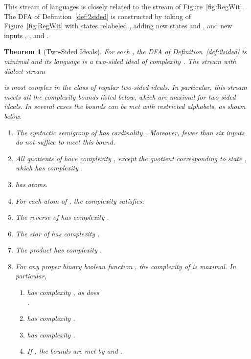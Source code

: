 \documentclass[final]{dmtcs-episciences}
\newcommand{\be}{\begin{enumerate}}
\newcommand{\ee}{\end{enumerate}}
\newtheorem{theorem}{Theorem}
\theoremstyle{definition}
\theoremstyle{remark}
\begin{document}
This stream of languages is closely related to the stream of Figure~\ref{fig:RegWit}.
The DFA  of Definition~\ref{def:2sided} is constructed by taking  of Figure~\ref{fig:RegWit} with states relabeled , adding new states  and , and new inputs ,  , and . 


\begin{theorem}[Two-Sided Ideals]
For each ,  
the DFA  of Definition~\ref{def:2sided} is minimal and its 
language  is a two-sided ideal of complexity .
The stream   with dialect stream

is most complex in the class of regular two-sided ideals.
In particular, this stream meets all the complexity bounds listed below, which are maximal for two-sided ideals. In several cases the bounds can be met with restricted alphabets, as shown below.
\be
\item
The syntactic semigroup of  has cardinality .  Moreover, fewer than six inputs do not suffice to meet this bound.
\item
All quotients of  have complexity , except the quotient corresponding to state , which has complexity .
\item
 has  atoms. 


\item
For each atom  of , the complexity  satisfies:

\item
The reverse of  has complexity .

\item
The star of  has complexity .
\item
The product  has complexity .
\item
For any proper binary boolean function , the complexity of 
is maximal. In particular,
	\be
	\item
	  has complexity , as does\\ 
	 .
	 \item
	 has complexity 	.
	\item
	 has complexity 	.
	\item 
	If , the bounds are met by  and .
	\ee
\ee
\end{theorem}
\end{document}
